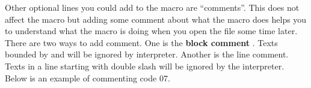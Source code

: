 Other optional lines you could add to the macro are ``comments''. This does not affect the macro but adding some comment about what the macro does helps you to understand what the macro is doing when you open the file some time later. There are two ways to add comment. One is the \textbf{block comment} . Texts bounded by \ilcom{ /*} and \ilcom{*/} will be ignored by interpreter. Another is the line comment. Texts in a line starting with double slash \ilcom{//} will be ignored by the interpreter. Below is an example of commenting code 07.